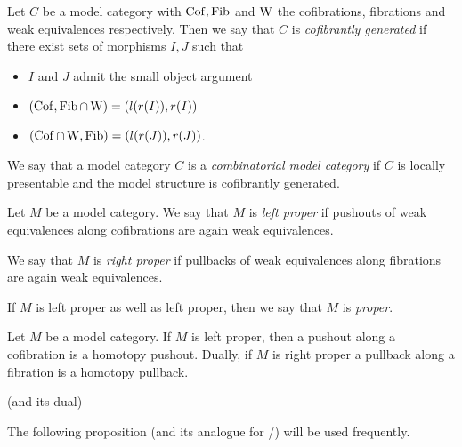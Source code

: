 \begin{definition}
    Let $C$ be a model category with $\operatorname{Cof},\operatorname{Fib}$ and $\operatorname{W}$ the cofibrations, fibrations and weak equivalences respectively.
    Then we say that $C$ is \emph{cofibrantly generated} if there exist sets of morphisms $I,J$ such that
    \begin{itemize}
        \item $I$ and $J$ admit the small object argument
        \item $(\operatorname{Cof},\operatorname{Fib}\cap\operatorname{W})=(l(r(I)),r(I))$
        \item $(\operatorname{Cof}\cap\operatorname{W},\operatorname{Fib})=(l(r(J)),r(J))$.
    \end{itemize} 
\end{definition}
\begin{definition}
    We say that a model category $C$ is a \emph{combinatorial model category} if $C$ is locally presentable and the model structure is cofibrantly generated.
\end{definition} %
\begin{definition}[Properness] %
    Let $M$ be a model category.
    We say that $M$ is \emph{left proper} if pushouts of weak equivalences along cofibrations are again weak equivalences.
    
    We say that $M$ is \emph{right proper} if pullbacks of weak equivalences along fibrations are again weak equivalences.
    
    If $M$ is left proper as well as left proper, then we say that $M$ is \emph{proper}.
\end{definition}
\begin{prop}
    Let $M$ be a model category.
    If $M$ is left proper, then a pushout along a cofibration is a homotopy pushout.
    Dually, if $M$ is right proper a pullback along a fibration is a homotopy pullback.
    \begin{reference}
        \cite[Proposition A.2.4.4]{HTT} (and its dual)
    \end{reference}
\end{prop}
The following proposition (and its analogue for \inftycats/) will be used frequently.
